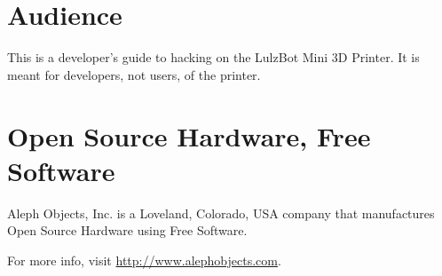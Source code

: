 %
%
%
%
%

\section{Audience}
This is a developer's guide to hacking on the LulzBot Mini 3D Printer.
It is meant for developers, not users, of the printer.

\section{Open Source Hardware, Free Software}

Aleph Objects, Inc. is a Loveland, Colorado, USA company that manufactures
Open Source Hardware using Free Software.

For more info, visit \url{http://www.alephobjects.com}.

